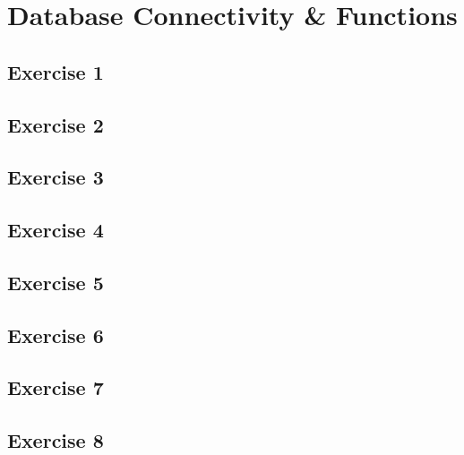 \chapter{Database Connectivity \& Functions}
\graphicspath{{6-db-functions/images/}}

\section{Exercise 1}
\section{Exercise 2}
\section{Exercise 3}
\section{Exercise 4}
\section{Exercise 5}
\section{Exercise 6}
\section{Exercise 7}
\section{Exercise 8}
